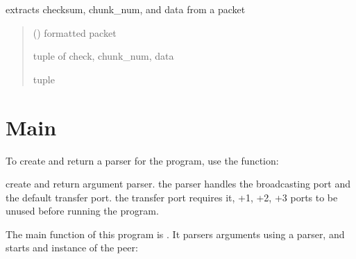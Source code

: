 \documentclass[letterpaper,10pt,english,openany,oneside]{sphinxmanual}
\begin{document}
\begin{fulllineitems}
\label{\detokenize{index:packet.parse_packet}}
\pysigstartsignatures
\pysiglinewithargsret
{}
{}
{}
\pysigstopsignatures
\sphinxAtStartPar
extracts checksum, chunk\_num, and data from a packet
\begin{quote}\begin{description}
\sphinxAtStartPar
{} () \textendash{} formatted packet

 tuple of check, chunk\_num, data

\sphinxAtStartPar
tuple

\end{description}\end{quote}

\end{fulllineitems}



\chapter{Main}
\label{\detokenize{index:main}}
\sphinxAtStartPar
To create and return a parser for the program, use the  function:

\begin{fulllineitems}
\label{\detokenize{index:main.parse_arguments}}
\pysigstartsignatures
\pysiglinewithargsret
{}
{}
{}
\pysigstopsignatures
\sphinxAtStartPar
create and return argument parser. the parser handles the broadcasting port and the default transfer port.
the transfer port requires it, +1, +2, +3 ports to be unused before running the program.

\end{fulllineitems}


\sphinxAtStartPar
The main function of this program is . It parsers arguments using a parser, and starts
and instance of the peer:
\end{document}
